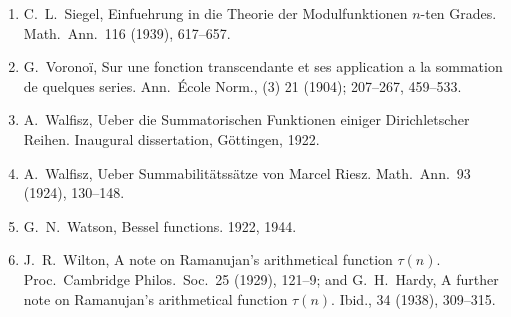 \documentclass[12pt]{article}
\begin{document}
\begin{enumerate}
\item C.~L.~Siegel, Einfuehrung in die Theorie der Modulfunktionen \(n\)-ten Grades. Math.~Ann.~116 (1939), 617–657.
\item G.~Voronoï, Sur une fonction transcendante et ses application a la sommation de quelques series. Ann.~École Norm., (3) 21 (1904); 207–267, 459–533.
\item A.~Walfisz, Ueber die Summatorischen Funktionen einiger Dirichletscher Reihen. Inaugural dissertation, Göttingen, 1922.
\item A.~Walfisz, Ueber Summabilitätssätze von Marcel Riesz. Math.~Ann.~93 (1924), 130–148.
\item G.~N.~Watson, Bessel functions. 1922, 1944.
\item J.~R.~Wilton, A note on Ramanujan's arithmetical function \(\tau(n)\). Proc.~Cambridge Philos.~Soc.~25 (1929), 121–9; and G.~H.~Hardy, A further note on Ramanujan's arithmetical function \(\tau(n)\). Ibid., 34 (1938), 309–315.
\end{enumerate}
\end{document}
